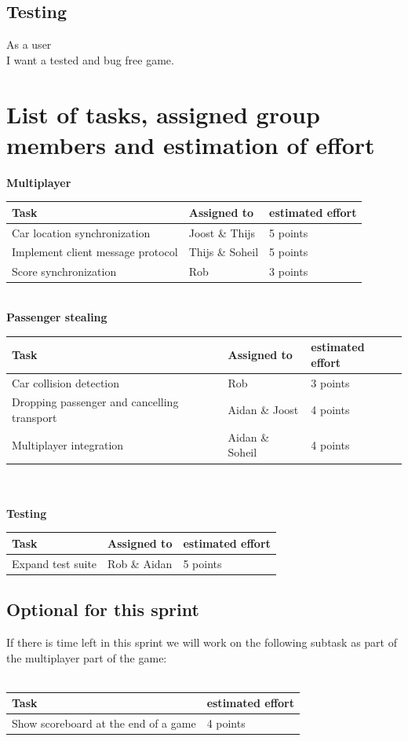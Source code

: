 \documentclass{article}
\begin{document}
\subsection*{Testing}
As a user\\ I want a tested and bug free game.
\section*{List of tasks, assigned group members and estimation of effort}
\textbf{Multiplayer} \\
\begin{tabular}{ | l | l | l | }
\hline
\textbf{Task} & \textbf{Assigned to} & \textbf{estimated effort} \\ \hline
Car location synchronization & Joost \& Thijs & 5 points \\ \hline
Implement client message protocol & Thijs \& Soheil & 5 points \\\hline
Score synchronization & Rob & 3 points \\ \hline
\end{tabular} \newline
\newline \\
\textbf{Passenger stealing} \\
\begin{tabular}{ | l | l | l | }
\hline
\textbf{Task} & \textbf{Assigned to} & \textbf{estimated effort} \\ \hline
Car collision detection & Rob & 3 points\\ \hline
Dropping passenger and cancelling transport & Aidan \& Joost & 4 points\\ \hline
Multiplayer integration & Aidan \& Soheil & 4 points\\ \hline
\end{tabular}
\newline\\\\
\textbf{Testing}\\
\begin{tabular}{ | l | l | l | }
\hline
\textbf{Task} & \textbf{Assigned to} & \textbf{estimated effort} \\ \hline
Expand test suite & Rob \& Aidan & 5 points \\
 \hline
 \end{tabular}

\subsection*{Optional for this sprint}
If there is time left in this sprint we will work on the following subtask as part of the multiplayer part of the game:\\\\
\begin{tabular}{ | l | l | }
\hline
\textbf{Task} & \textbf{estimated effort} \\ \hline
Show scoreboard at the end of a game & 4 points \\ \hline

\end{tabular}
\end{document}
